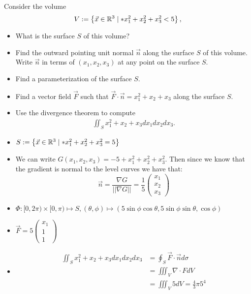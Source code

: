 \documentclass[11pt]{article}
\begin{document}




\begin{exercise}
    Consider the volume 
    \begin{align}
     V := \left\{ \vec x \in \bbR^3 \suchthat* x_1^2 + x_2^2 + x_3^2 < 5 \right\},
    \end{align}
    \begin{itemize}
     \item
     What is the surface $S$ of this volume?
     \item 
     Find the outward pointing unit normal $\vec n$ along the surface $S$ of this volume. Write $\vec n$ in terms of $(x_1,x_2,x_3)$ at any point on the surface $S$. 
     \item
     Find a parameterization of the surface $S$.
     \item
     Find a vector field $\vec F$ such that $\vec F \cdot \vec n = x_1^2 + x_2 + x_3$ along the surface $S$.
     \item 
     Use the divergence theorem to compute 
     \begin{align}
        \iint_{S} x_1^2 + x_2 + x_3 dx_1 dx_2 dx_3.
     \end{align}
    \end{itemize}
\end{exercise}
\begin{solution}     
    \begin{itemize}
     \item $S := \left\{ \vec x \in \bbR^3 \suchthat* x_1^2 + x_2^2 + x_3^2 = 5 \right\}$
     \item We can write $G(x_1,x_2,x_3) = -5 + x_1^2 + x_2^2 + x_3^2$. Then since we know that the gradient is normal to the level curves we have that:
$$
\vec{n} = \frac{\nabla G}{||\nabla G||} = \frac{1}{5}\begin{pmatrix}
x_1\\x_2\\x_3
\end{pmatrix}
$$
     \item $\Phi: [0,2\pi)\times[0,\pi) \mapsto S, (\theta,\phi) \mapsto (5\sin\phi\cos\theta, 5\sin\phi\sin\theta,\cos\phi)$
     \item $\vec{F} = 5\begin{pmatrix}x_1\\1\\1\end{pmatrix}$
     \item \begin{align*}
        \iint_{S} x_1^2 + x_2 + x_3 dx_1 dx_2 dx_3 & = \oint_{S} \vec{F}\cdot\vec{n} d\sigma \\
		& = \iiint_V \nabla \cdot F dV\\
		& = \iiint_V 5 dV = \frac{4}{3}\pi5^4\\
     \end{align*}
    \end{itemize}
\end{solution}
\end{document}
